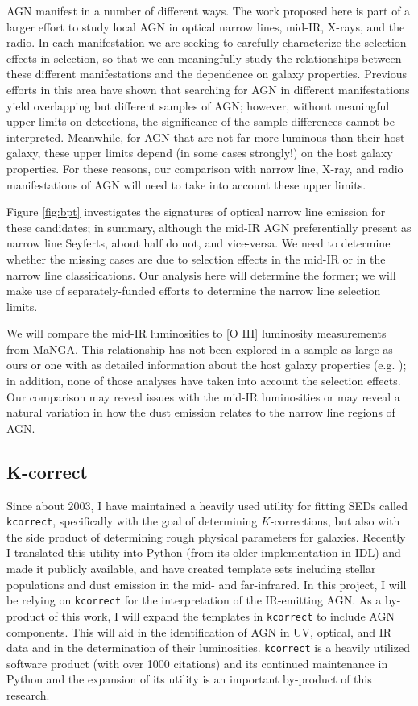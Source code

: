\documentclass[12pt, preprint]{hacked-aastex}
\begin{document}
AGN manifest in a number of different ways. The work proposed here is
part of a larger effort to study local AGN in optical narrow lines,
mid-IR, X-rays, and the radio. In each manifestation we are seeking to
carefully characterize the selection effects in selection, so that we
can meaningfully study the relationships between these different
manifestations and the dependence on galaxy properties. Previous
efforts in this area have shown that searching for AGN in different
manifestations yield overlapping but different samples of AGN;
however, without meaningful upper limits on detections, the
significance of the sample differences cannot be
interpreted. Meanwhile, for AGN that are not far more luminous than
their host galaxy, these upper limits depend (in some cases strongly!)
on the host galaxy properties.  For these reasons, our comparison with
narrow line, X-ray, and radio manifestations of AGN will need to take
into account these upper limits.

Figure \ref{fig:bpt} investigates the signatures of optical narrow
line emission for these candidates; in summary, although the mid-IR
AGN preferentially present as narrow line Seyferts, about half do not,
and vice-versa. We need to determine whether the missing cases are due
to selection effects in the mid-IR or in the narrow line
classifications. Our analysis here will determine the former; we will
make use of separately-funded efforts to determine the narrow line
selection limits. 

We will compare the mid-IR luminosities to [O III] luminosity
measurements from MaNGA. This relationship has not been explored in a
sample as large as ours or one with as detailed information about the
host galaxy properties (e.g. \cite{lamassa12a}); in addition, none of
those analyses have taken into account the selection effects. Our
comparison may reveal issues with the mid-IR luminosities or may
reveal a natural variation in how the dust emission relates to the
narrow line regions of AGN. 

\subsection{K-correct}

Since about 2003, I have maintained a heavily used utility for fitting
SEDs called {\tt kcorrect}, specifically with the goal of determining
$K$-corrections, but also with the side product of determining rough
physical parameters for galaxies. Recently I translated this utility
into Python (from its older implementation in IDL) and made it
publicly available, and have created template sets including stellar
populations and dust emission in the mid- and far-infrared.  In this
project, I will be relying on {\tt kcorrect} for the interpretation of
the IR-emitting AGN. As a by-product of this work, I will expand the
templates in {\tt kcorrect} to include AGN components. This will aid
in the identification of AGN in UV, optical, and IR data and in the
determination of their luminosities.  {\tt kcorrect} is a heavily
utilized software product (with over 1000 citations) and its continued
maintenance in Python and the expansion of its utility is an important
by-product of this research.
\end{document}
